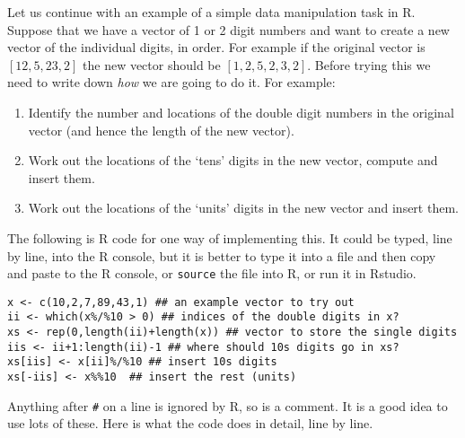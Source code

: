 \documentclass[10pt] {article}
\theoremstyle{definition}
\begin{document}
Let us continue with an example of a simple data manipulation task in R. Suppose that we have a vector of 1 or 2 digit numbers and want to create a new vector of the individual digits, in order. For example if the original vector is $[12,5,23,2]$ the new vector should be $[1,2,5,2,3,2]$. Before trying this we need to write down {\em how} we are going to do it. For example:
\begin{enumerate}
\item Identify the number and locations of the double digit numbers in the original vector (and hence the length of the new vector).
\item Work out the locations of the `tens' digits in the new vector, compute and insert them.
\item Work out the locations of the `units' digits in the new vector and insert them. 
\end{enumerate}
The following is R code for one way of implementing this. It could be typed, line by line, into the R console, but it is better to type it into a file and then copy and paste to the R console, or {\tt source} the file into R, or run it in Rstudio. 
\begin{lstlisting}
x <- c(10,2,7,89,43,1) ## an example vector to try out
ii <- which(x%/%10 > 0) ## indices of the double digits in x?
xs <- rep(0,length(ii)+length(x)) ## vector to store the single digits
iis <- ii+1:length(ii)-1 ## where should 10s digits go in xs?
xs[iis] <- x[ii]%/%10 ## insert 10s digits
xs[-iis] <- x%%10  ## insert the rest (units)
\end{lstlisting}  
Anything after \lstinline+#+ on a line is ignored by R, so is a comment. It is a good idea to use lots of these. Here is what the code does in detail, line by line.
\end{document}
